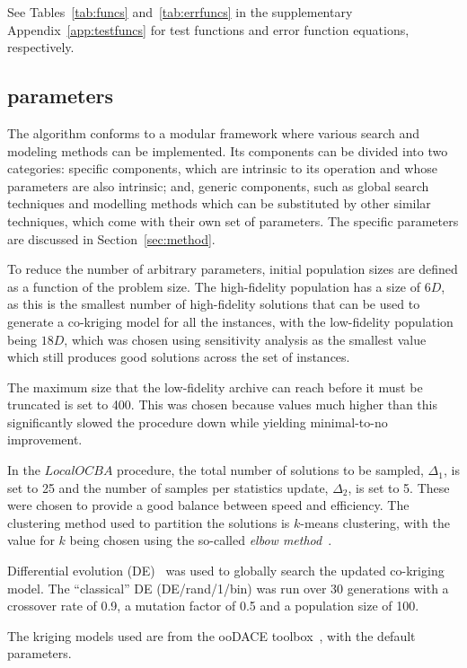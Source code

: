 See Tables~\ref{tab:funcs} and~\ref{tab:errfuncs} in the supplementary Appendix~\ref{app:testfuncs} for test functions and error function equations, respectively.

\subsection{\AlgName{} parameters}
The \AlgName{} algorithm conforms to a modular framework where various search and modeling methods can be implemented. Its components can be divided into two categories: \AlgName{} specific components, which are intrinsic to its operation and whose parameters are also intrinsic; and, generic components, such as global search techniques and modelling methods which can be substituted by other similar techniques, which come with their own set of parameters. The \AlgName{} specific parameters are discussed in Section~\ref{sec:method}.

To reduce the number of arbitrary parameters, initial population sizes are defined as a function of the problem size. The high-fidelity population has a size of $6D$, as this is the smallest number of high-fidelity solutions that can be used to generate a co-kriging model for all the instances, with the low-fidelity population being $18D$, which was chosen using sensitivity analysis as the smallest value which still produces good solutions across the set of instances.

The maximum size that the low-fidelity archive can reach before it must be truncated is set to 400. This was chosen because values much higher than this significantly slowed the procedure down while yielding minimal-to-no improvement. 

In the $LocalOCBA$ procedure, the total number of solutions to be sampled, $\Delta_1$, is set to 25 and the number of samples per statistics update, $\Delta_2$, is set to 5. These were chosen to provide a good balance between speed and efficiency. The clustering method used to partition the solutions is $k$-means clustering, with the value for $k$ being chosen using the so-called \emph{elbow method}~\cite{leonard1990finding}.

Differential evolution (DE)~\cite{storn1997differential} was used to globally search the updated co-kriging model. The ``classical'' DE (DE/rand/1/bin) was run over 30 generations with a crossover rate of 0.9, a mutation factor of 0.5 and a population size of 100.

The kriging models used are from the ooDACE toolbox~\cite{oodace}, with the default parameters.

